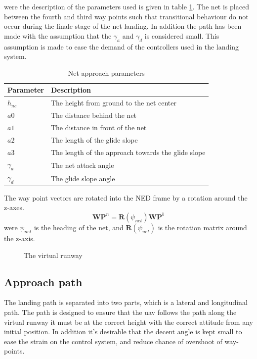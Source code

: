 were the description of the parameters used is given in table \ref{Tb:Approach Parameters}. The net is placed between the fourth and third way points such that transitional behaviour do not occur during the finale stage of the net landing. In addition the path has been made with the assumption that the $\gamma_a$ and $\gamma_d$ is considered small. This assumption is made to ease the demand of the controllers used in the landing system.
\begin{table}[H]
\begin{center}
    \begin{tabular}{ | l | l |}
    \hline
    \textbf{Parameter} & \textbf{Description} \\ \hline
    $h_{nc}$ & The height from ground to the net center \\ \hline
    $a0$ & The distance behind the net \\ \hline
    $a1$ & The distance in front of the net \\ \hline
    $a2$ & The length of the glide slope \\ \hline
    $a3$ & The length of the approach towards the glide slope \\ \hline
    $\gamma_a$ & The net attack angle \\ \hline
    $\gamma_d$ & The glide slope angle \\ \hline
    \end{tabular}
\end{center}
\caption{Net approach parameters }
\label{Tb:Approach Parameters}
\end{table}
The way point vectors are rotated into the NED frame by a rotation around the z-axes.
\begin{equation}
\mathbf{WP}^n = \mathbf{R}(\psi_{net})\mathbf{WP}^b
\end{equation}
were $\psi_{net}$ is the heading of the net, and $\mathbf{R}(\psi_{net})$ is the rotation matrix around the z-axis.
\begin{figure}
\def\svgwidth{\textwidth} %

\caption{The virtual runway}
\label{Fig:LandingPhase}
\end{figure}

\subsection{Approach path}\label{SS:LandingApproach}
The landing path is separated into two parts, which is a lateral and longitudinal path. The path is designed to ensure that the \gls{uav} follows the path along the virtual runway it must be at the correct height with the correct attitude from any initial position. In addition it's desirable that the decent angle is kept small to ease the strain on the control system, and reduce chance of overshoot of way-points.
